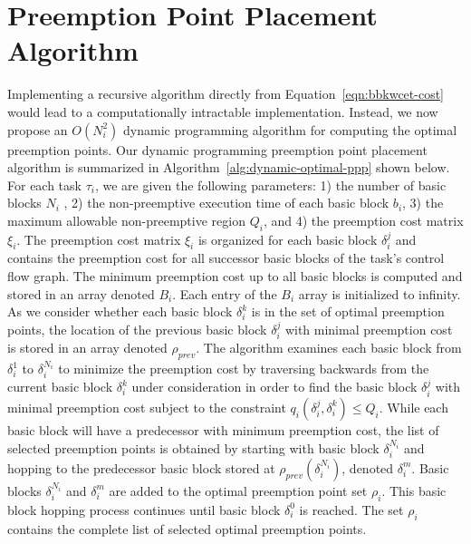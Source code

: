 \vspace{-5pt}
\section{Preemption Point Placement Algorithm}\label{sec:implementation}

 Implementing a recursive algorithm directly from Equation~\ref{eqn:bbkwcet-cost} would lead to a computationally intractable implementation.  Instead, we now propose an \begin{math}O(N_i^{2})\end{math} dynamic programming algorithm for computing the optimal preemption points.  Our dynamic programming preemption point placement algorithm is summarized in Algorithm~\ref{alg:dynamic-optimal-ppp} shown below.  For each task $\tau_i$, we are given the following parameters: 1) the number of basic blocks $N_i$ , 2) the non-preemptive execution time of each basic block $b_i$, 3) the maximum allowable non-preemptive region $Q_i$, and 4) the preemption cost matrix $\xi_i$.  The preemption cost matrix $\xi_i$ is organized for each basic block \begin{math}\delta_{i}^{j}\end{math} and contains the preemption cost for all successor basic blocks of the task's control flow graph.  The minimum preemption cost up to all basic blocks is computed and stored in an array denoted $B_{i}$.  Each entry of the $B_i$ array is initialized to infinity.  
 As we consider whether each basic block $\delta_{i}^{k}$ is in the set of optimal preemption points, the location of the previous basic block $\delta_{i}^{j}$ with minimal preemption cost is stored in an array denoted $\rho_{prev}$.  The algorithm examines each basic block from \begin{math}\delta_{i}^{1}\end{math} to \begin{math}\delta_{i}^{N_i}\end{math} to minimize the preemption cost by traversing backwards from the current basic block $\delta_{i}^{k}$ under consideration in order to find the basic block $\delta_{i}^{j}$ with minimal preemption cost subject to the constraint $q_{i}(\delta_{i}^{j},\delta_{i}^{k}) \leq Q_{i}$.  While each basic block will have a predecessor with minimum preemption cost, the list of selected preemption points is obtained by starting with basic block $\delta_{i}^{N_i}$ and hopping to the predecessor basic block stored at $\rho_{prev}(\delta_{i}^{N_i})$, denoted $\delta_{i}^{m}$.  Basic blocks $\delta_{i}^{N_i}$ and $\delta_{i}^{m}$ are added to the optimal preemption point set $\rho_{i}$.  This basic block hopping process continues until basic block $\delta_{i}^{0}$ is reached.  The set $\rho_{i}$ contains the complete list of selected optimal preemption points.
